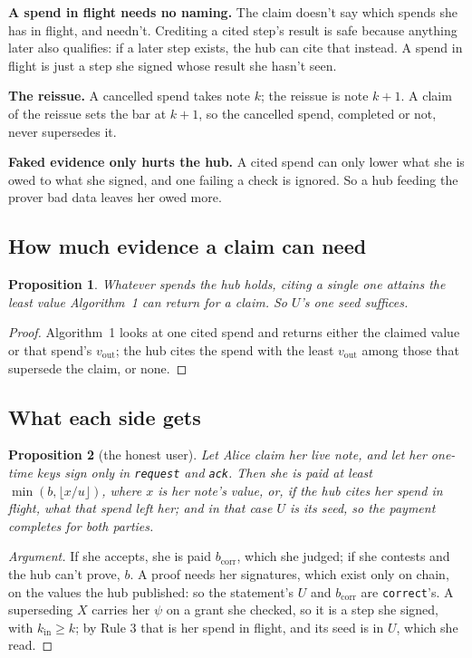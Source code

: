 \documentclass[11pt]{article}
\theoremstyle{plain}
\newtheorem{proposition}{Proposition}
\theoremstyle{definition}
\newcommand{\bcorr}{b_{\mathrm{corr}}}
\newcommand{\tx}[1]{\texttt{#1}}
\newcommand{\kin}{k_{\mathrm{in}}}
\newcommand{\vout}{v_{\mathrm{out}}}
\begin{document}
\textbf{A spend in flight needs no naming.} The claim doesn't say which
spends she has in flight, and needn't. Crediting a cited step's result
is safe because anything later also qualifies: if a later step exists,
the hub can cite that instead. A spend in flight is just a step she
signed whose result she hasn't seen.

\textbf{The reissue.} A cancelled spend takes note $k$; the reissue is
note $k + 1$. A claim of the reissue sets the bar at $k + 1$, so the
cancelled spend, completed or not, never supersedes it.

\textbf{Faked evidence only hurts the hub.} A cited spend can only lower
what she is owed to what she signed, and one failing a check is ignored.
So a hub feeding the prover bad data leaves her owed more.

\subsection{How much evidence a claim can need}\label{sec:volume}

\begin{proposition}\label{prop:volume}
Whatever spends the hub holds, citing a single one attains the least
value Algorithm~1 can return for a claim. So $U$'s one seed suffices.
\end{proposition}
\begin{proof}
Algorithm~1 looks at one cited spend and returns either the claimed
value or that spend's $\vout$; the hub cites the spend with the least
$\vout$ among those that supersede the claim, or none.
\end{proof}

\subsection{What each side gets}\label{sec:who}

\begin{proposition}[the honest user]\label{prop:user}
Let Alice claim her live note, and let her one-time keys sign only in
\tx{request} and \tx{ack}. Then she is paid at least $\min(b, \lfloor
x/u \rfloor)$, where $x$ is her note's value, or, if the hub cites her
spend in flight, what that spend left her; and in that case $U$ is its
seed, so the payment completes for both parties.
\end{proposition}
\begin{proof}[Argument]
If she accepts, she is paid $\bcorr$, which she judged; if she contests
and the hub can't prove, $b$. A proof needs her signatures, which exist
only on chain, on the values the hub published: so the statement's $U$
and $\bcorr$ are \tx{correct}'s. A superseding $X$ carries her $\psi$ on
a grant she checked, so it is a step she signed, with $\kin \ge k$; by
Rule 3 that is her spend in flight, and its seed is in $U$, which she
read.
\end{proof}
\end{document}
